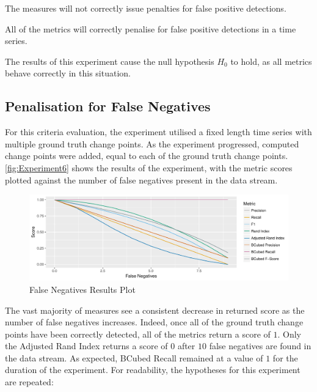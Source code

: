 \documentclass[../main.tex]{subfiles}
\begin{document}
\begin{hypothesis*}
    The measures will not correctly issue penalties for false positive detections.
\end{hypothesis*}

\begin{nullhypothesis*}
    All of the metrics will correctly penalise for false positive detections in a time series.
\end{nullhypothesis*}

The results of this experiment cause the null hypothesis $H_0$ to hold, as all metrics behave correctly in this situation.

\subsection{Penalisation for False Negatives}

For this criteria evaluation, the experiment utilised a fixed length time series with multiple ground truth change points. As the experiment progressed, computed change points were added, equal to each of the ground truth change points. \autoref{fig:Experiment6} shows the results of the experiment, with the metric scores plotted against the number of false negatives present in the data stream.

\begin{figure}[h]
    \includegraphics[width=\textwidth]{figures/Experiment6}
    \caption{False Negatives Results Plot}
    \label{fig:Experiment6}
\end{figure}

The vast majority of measures see a consistent decrease in returned score as the number of false negatives increases. Indeed, once all of the ground truth change points have been correctly detected, all of the metrics return a score of $1$. Only the Adjusted Rand Index returns a score of $0$ after $10$ false negatives are found in the data stream. As expected, BCubed Recall remained at a value of $1$ for the duration of the experiment. For readability, the hypotheses for this experiment are repeated:
\end{document}
